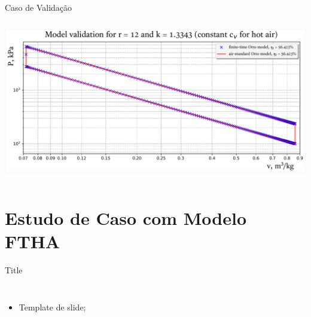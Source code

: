     \begin{frame}{Caso de Validação}\vspace*{-2em}
        \begin{center}
            \vspace*{-5mm}\includegraphics[height=70.0mm]{fig/val_r=12,0_k=1,334.pdf}
        \end{center}
    \end{frame}

\section{Estudo de Caso com Modelo FTHA}

    \begin{frame}{Title}\vspace*{-2em}
        \begin{columns}
        \begin{itemize}
            \item<1-> \alert{Template} de slide;
        \end{itemize}
        \begin{center}
        \end{center}
        \end{columns}
    \end{frame}

